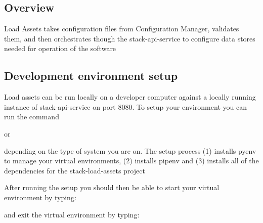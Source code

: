 \hypertarget{overview}{%
\subsection{Overview}\label{overview}}

Load Assets takes configuration files from Configuration Manager,
validates them, and then orchestrates though the stack-api-service to
configure data stores needed for operation of the software

\hypertarget{development-environment-setup}{%
\subsection{Development environment
setup}\label{development-environment-setup}}

Load assets can be run locally on a developer computer against a locally
running instance of stack-api-service on port 8080. To setup your
environment you can run the command

\begin{Shaded}
\begin{Highlighting}[]
\end{Highlighting}
\end{Shaded}

or

\begin{Shaded}
\begin{Highlighting}[]
\end{Highlighting}
\end{Shaded}

depending on the type of system you are on. The setup process (1)
installs pyenv to manage your virtual environments, (2) installs pipenv
and (3) installs all of the dependencies for the stack-load-assets
project

After running the setup you should then be able to start your virtual
environment by typing:

\begin{Shaded}
\begin{Highlighting}[]
\end{Highlighting}
\end{Shaded}

and exit the virtual environment by typing:

\begin{Shaded}
\begin{Highlighting}[]
\end{Highlighting}
\end{Shaded}

